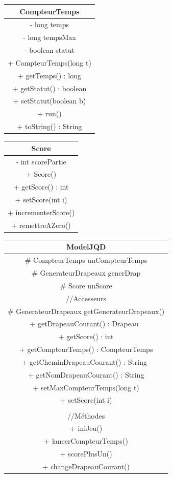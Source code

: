 \documentclass{article}
\begin{document}
\begin{center}
\begin{tabular}{|c|}
	\hline
\end{tabular}
\begin{tabular}{|c|}
	\hline
	CompteurTemps\\
	\hline
	- long temps\\
	- long tempsMax\\
	- boolean statut\\
	\hline
	+ CompteurTemps(long t)\\
	+ getTemps() : long \\
	+ getStatut() : boolean \\
	+ setStatut(boolean b)\\
	+ run()\\
	+ toString() : String\\
	\hline
\end{tabular}
\hspace{2cm}\begin{tabular}{|c|}
	\hline
	Score\\
	\hline
	- int scorePartie\\
	\hline
	+ Score()\\
	+ getScore() : int\\
	+ setScore(int i) \\
	+ incrementerScore()\\
	+ remettreAZero()\\
	\hline
\end{tabular}
\begin{longtable}{|c|}
	\hline
	ModelJQD\\
	\hline
	\# CompteurTemps unCompteurTemps\\
	\# GenerateurDrapeaux generDrap\\
	\# Score unScore\\
	\hline
	//Accesseurs\\
	\# GenerateurDrapeaux getGenerateurDrapeaux()\\
	+ getDrapeauCourant() : Drapeau \\
	+ getScore() : int\\
	+ getCompteurTemps() : CompteurTemps \\
	+ getCheminDrapeauCourant() : String \\
	+ getNomDrapeauCourant() : String\\
	+ setMaxCompteurTemps(long t)\\
	+ setScore(int i)\\
	\\
	//Méthodes\\
	+ iniJeu()\\
	+ lancerCompteurTemps()\\
	+ scorePlusUn()\\
	+ changeDrapeauCourant()\\
	\hline
\end{longtable}

\end{center}
\end{document}
